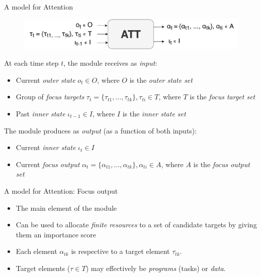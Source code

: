 \documentclass[10pt]{beamer}
\begin{document}
\begin{frame}{A model for Attention}
    \begin{figure}
        \centering
        \includegraphics[width=1.0\linewidth]{./img/alt_att_block.pdf}
    \end{figure}
    At each time step $t$, the module receives as \emph{input}:
    \begin{itemize}
        \item Current \emph{outer state} $o_t \in O$, where $O$ is the \emph{outer state set}
        \item Group of \emph{focus targets} $\tau_t = \{\tau_{t1}, \ldots, \tau_{tk}\}, \tau_{ti} \in T$, where $T$ is the \emph{focus target set}
        \item Past \emph{inner state} $\iota_{t-1} \in I$, where $I$ is the \emph{inner state set}
    \end{itemize}

    The module produces as \emph{output} (as a function of both inputs):
    \begin{itemize}
        \item Current \emph{inner state} $\iota_t \in I$
        \item Current \emph{focus output} $\alpha_t = \{\alpha_{t1}, \ldots, \alpha_{tk}\}, \alpha_{ti} \in A$,
            where $A$ is the \emph{focus output set}
    \end{itemize}
\end{frame}

\begin{frame}{A model for Attention: Focus output}
    \begin{itemize}
        \item The main element of the module
        \item Can be used to allocate \emph{finite resources} to a set of candidate targets by giving them an importance score
        \item Each element $\alpha_{tk}$ is respective to a target element $\tau_{tk}$.
        \item Target elements ($\tau \in T$) may effectively be \emph{programs} (tasks) or \emph{data}.
    \end{itemize}
\end{frame}
\end{document}
